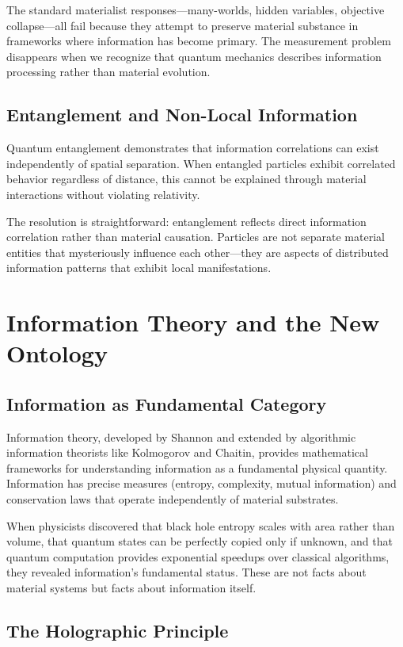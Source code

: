 \documentclass[12pt]{article}
\begin{document}
The standard materialist responses—many-worlds, hidden variables, objective collapse—all fail because they attempt to preserve material substance in frameworks where information has become primary. The measurement problem disappears when we recognize that quantum mechanics describes information processing rather than material evolution.

\subsection{Entanglement and Non-Local Information}

Quantum entanglement demonstrates that information correlations can exist independently of spatial separation. When entangled particles exhibit correlated behavior regardless of distance, this cannot be explained through material interactions without violating relativity.

The resolution is straightforward: entanglement reflects direct information correlation rather than material causation. Particles are not separate material entities that mysteriously influence each other—they are aspects of distributed information patterns that exhibit local manifestations.

\section{Information Theory and the New Ontology}

\subsection{Information as Fundamental Category}

Information theory, developed by Shannon and extended by algorithmic information theorists like Kolmogorov and Chaitin, provides mathematical frameworks for understanding information as a fundamental physical quantity. Information has precise measures (entropy, complexity, mutual information) and conservation laws that operate independently of material substrates.

When physicists discovered that black hole entropy scales with area rather than volume, that quantum states can be perfectly copied only if unknown, and that quantum computation provides exponential speedups over classical algorithms, they revealed information's fundamental status. These are not facts about material systems but facts about information itself.

\subsection{The Holographic Principle}
\end{document}
